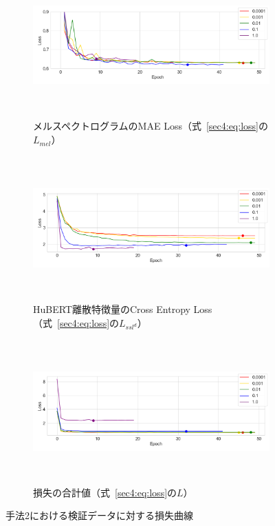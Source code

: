 \documentclass[12pt]{jarticle}
\numberwithin{equation}{section}    %
\numberwithin{figure}{section}      %
\numberwithin{table}{section}      %
\begin{document}
\begin{figure}[bt]
    \centering
    \begin{subfigure}{\linewidth}
        \centering
        \includegraphics[height=55mm]{./figure/sec4/loss_curve/2/mel_loss.png}
        \caption{メルスペクトログラムのMAE Loss（式~\eqref{sec4:eq:loss}の$L_{mel}$）}
        \label{sec4:fig:method_2_val_mel_loss}
    \end{subfigure}
    \begin{subfigure}{\linewidth}
        \centering
        \includegraphics[height=55mm]{./figure/sec4/loss_curve/2/ssl_feature_cluster_loss.png}
        \caption{HuBERT離散特徴量のCross Entropy Loss（式~\eqref{sec4:eq:loss}の$L_{ssl^{d}}$）}
        \label{sec4:fig:method_2_val_ssl_feature_cluster_loss}
    \end{subfigure}
    \begin{subfigure}{\linewidth}
        \centering
        \includegraphics[height=55mm]{./figure/sec4/loss_curve/2/total_loss.png}
        \caption{損失の合計値（式~\eqref{sec4:eq:loss}の$L$）}
        \label{sec4:fig:method_2_val_total_loss}
    \end{subfigure}
    \caption{手法2における検証データに対する損失曲線}
    \label{sec4:fig:method_2_val_losses}
\end{figure}
\end{document}
